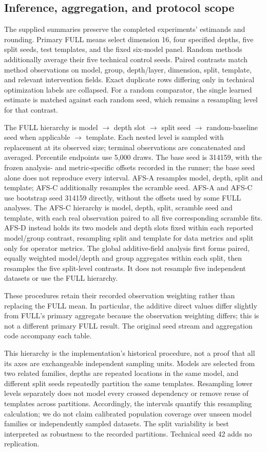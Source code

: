 \subsection{Inference, aggregation, and protocol scope}
\label{app:inference}
The supplied summaries preserve the completed experiments' estimands and rounding. Primary FULL means select dimension 16, four specified depths, five split seeds, test templates, and the fixed six-model panel. Random methods additionally average their five technical control seeds. Paired contrasts match method observations on model, group, depth/layer, dimension, split, template, and relevant intervention fields. Exact duplicate rows differing only in technical optimization labels are collapsed. For a random comparator, the single learned estimate is matched against each random seed, which remains a resampling level for that contrast.

The FULL hierarchy is model $\rightarrow$ depth slot $\rightarrow$ split seed $\rightarrow$ random-baseline seed when applicable $\rightarrow$ template. Each nested level is sampled with replacement at its observed size; terminal observations are concatenated and averaged. Percentile endpoints use 5,000 draws. The base seed is 314159, with the frozen analysis- and metric-specific offsets recorded in the runner; the base seed alone does not reproduce every interval. AFS-A resamples model, depth, split and template; AFS-C additionally resamples the scramble seed. AFS-A and AFS-C use bootstrap seed 314159 directly, without the offsets used by some FULL analyses. The AFS-C hierarchy is model, depth, split, scramble seed and template, with each real observation paired to all five corresponding scramble fits. AFS-D instead holds its two models and depth slots fixed within each reported model/group contrast, resampling split and template for data metrics and split only for operator metrics. The global additive-field analysis first forms paired, equally weighted model/depth and group aggregates within each split, then resamples the five split-level contrasts. It does not resample five independent datasets or use the FULL hierarchy.

These procedures retain their recorded observation weighting rather than replacing the FULL mean. In particular, the additive direct values differ slightly from FULL's primary aggregate because the observation weighting differs; this is not a different primary FULL result. The original seed stream and aggregation code accompany each table.

This hierarchy is the implementation's historical procedure, not a proof that all its axes are exchangeable independent sampling units. Models are selected from two related families, depths are repeated locations in the same model, and different split seeds repeatedly partition the same templates. Resampling lower levels separately does not model every crossed dependency or remove reuse of templates across partitions. Accordingly, the intervals quantify this resampling calculation; we do not claim calibrated population coverage over unseen model families or independently sampled datasets. The split variability is best interpreted as robustness to the recorded partitions. Technical seed 42 adds no replication.


